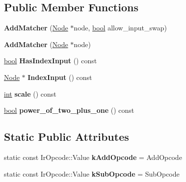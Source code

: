 \subsection*{Public Member Functions}
\begin{DoxyCompactItemize}
\item 
\mbox{\label{structv8_1_1internal_1_1compiler_1_1AddMatcher_aa5b57b0aff1e35b0605be084d8662093}} 
{\bfseries Add\+Matcher} (\mbox{\hyperlink{classv8_1_1internal_1_1compiler_1_1Node}{Node}} $\ast$node, \mbox{\hyperlink{classbool}{bool}} allow\+\_\+input\+\_\+swap)
\item 
\mbox{\label{structv8_1_1internal_1_1compiler_1_1AddMatcher_a5b39c9416c51aa743c6b1354a0439d91}} 
{\bfseries Add\+Matcher} (\mbox{\hyperlink{classv8_1_1internal_1_1compiler_1_1Node}{Node}} $\ast$node)
\item 
\mbox{\label{structv8_1_1internal_1_1compiler_1_1AddMatcher_a808ff6e42dde142411e16cb0d621edb6}} 
\mbox{\hyperlink{classbool}{bool}} {\bfseries Has\+Index\+Input} () const
\item 
\mbox{\label{structv8_1_1internal_1_1compiler_1_1AddMatcher_a9d46485a3c1ddd663256ce35231138cf}} 
\mbox{\hyperlink{classv8_1_1internal_1_1compiler_1_1Node}{Node}} $\ast$ {\bfseries Index\+Input} () const
\item 
\mbox{\label{structv8_1_1internal_1_1compiler_1_1AddMatcher_a97906b2b753fadd9d696a0e4a8fae5a1}} 
\mbox{\hyperlink{classint}{int}} {\bfseries scale} () const
\item 
\mbox{\label{structv8_1_1internal_1_1compiler_1_1AddMatcher_a195f227cbea2dbcc195600da005e53ce}} 
\mbox{\hyperlink{classbool}{bool}} {\bfseries power\+\_\+of\+\_\+two\+\_\+plus\+\_\+one} () const
\end{DoxyCompactItemize}
\subsection*{Static Public Attributes}
\begin{DoxyCompactItemize}
\item 
\mbox{\label{structv8_1_1internal_1_1compiler_1_1AddMatcher_a102d500a376329fc6d2d5c4381d5b078}} 
static const Ir\+Opcode\+::\+Value {\bfseries k\+Add\+Opcode} = Add\+Opcode
\item 
\mbox{\label{structv8_1_1internal_1_1compiler_1_1AddMatcher_aac3956ca03dcc543a5d809a8601cb922}} 
static const Ir\+Opcode\+::\+Value {\bfseries k\+Sub\+Opcode} = Sub\+Opcode
\end{DoxyCompactItemize}
